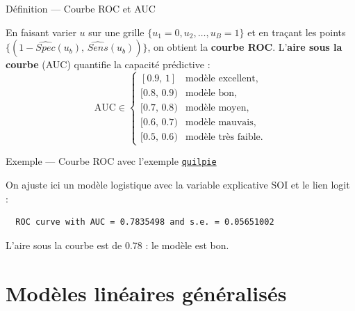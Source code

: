 \documentclass[
  french,
  letterpaper,
  DIV=11,
  numbers=noendperiod]{scrreprt}
\newenvironment{Shaded}{\begin{snugshade}}{\end{snugshade}}
\newcommand{\AttributeTok}[1]{\textcolor[rgb]{0.40,0.45,0.13}{#1}}
\newcommand{\FunctionTok}[1]{\textcolor[rgb]{0.28,0.35,0.67}{#1}}
\newcommand{\NormalTok}[1]{\textcolor[rgb]{0.00,0.23,0.31}{#1}}
\newcommand{\OtherTok}[1]{\textcolor[rgb]{0.00,0.23,0.31}{#1}}
\newcommand{\SpecialCharTok}[1]{\textcolor[rgb]{0.37,0.37,0.37}{#1}}
\newcommand{\StringTok}[1]{\textcolor[rgb]{0.13,0.47,0.30}{#1}}
\begin{document}
{Définition --- Courbe ROC et AUC}

En faisant varier \(u\) sur une grille
\(\{u_1 = 0, u_2, \ldots, u_B = 1\}\) et en traçant les points
\(\{(1-\widehat{Spec}(u_b),\, \widehat{Sens}(u_b))\}\), on obtient la
\textbf{courbe ROC}. L'\textbf{aire sous la courbe} (AUC) quantifie la
capacité prédictive : \[\mbox{AUC} \in \begin{cases}
[0.9,\,1] & \mbox{modèle excellent},\\
[0.8,\,0.9) & \mbox{modèle bon},\\
[0.7,\,0.8) & \mbox{modèle moyen},\\
[0.6,\,0.7) & \mbox{modèle mauvais},\\
[0.5,\,0.6) & \mbox{modèle très faible}.
\end{cases}\]

{Exemple --- Courbe ROC avec l'exemple
\hyperref[data-quilpie]{\texttt{quilpie}}}

On ajuste ici un modèle logistique avec la variable explicative SOI et
le lien logit :

\begin{Shaded}
\end{Shaded}

\begin{verbatim}
  ROC curve with AUC = 0.7835498 and s.e. = 0.05651002 
\end{verbatim}

L'aire sous la courbe est de 0.78 : le modèle est bon.


\chapter{Modèles linéaires généralisés}\label{sec-mlg}
\end{document}
